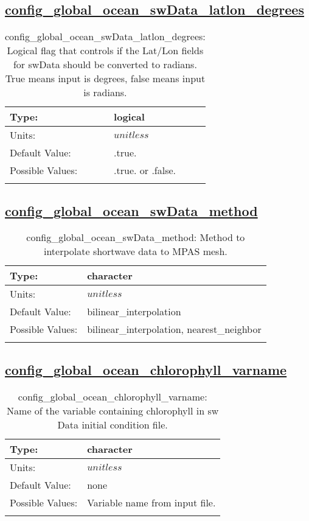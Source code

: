 \subsection[config\_global\_ocean\_swData\_latlon\_degrees]{\hyperref[sec:nm_tab_global_ocean]{config\_global\_ocean\_swData\_latlon\_degrees}}
\label{subsec:nm_sec_config_global_ocean_swData_latlon_degrees}
\begin{center}
\begin{longtable}{| p{2.0in} || p{4.0in} |}
    \hline
    Type: & logical \\
    \hline
    Units: & $unitless$ \\
    \hline
    Default Value: & .true. \\
    \hline
    Possible Values: & .true. or .false. \\
    \hline
    \caption{config\_global\_ocean\_swData\_latlon\_degrees: Logical flag that controls if the Lat/Lon fields for swData should be converted to radians. True means input is degrees, false means input is radians.}
\end{longtable}
\end{center}
\subsection[config\_global\_ocean\_swData\_method]{\hyperref[sec:nm_tab_global_ocean]{config\_global\_ocean\_swData\_method}}
\label{subsec:nm_sec_config_global_ocean_swData_method}
\begin{center}
\begin{longtable}{| p{2.0in} || p{4.0in} |}
    \hline
    Type: & character \\
    \hline
    Units: & $unitless$ \\
    \hline
    Default Value: & bilinear\_interpolation \\
    \hline
    Possible Values: & bilinear\_interpolation, nearest\_neighbor \\
    \hline
    \caption{config\_global\_ocean\_swData\_method: Method to interpolate shortwave data to MPAS mesh.}
\end{longtable}
\end{center}
\subsection[config\_global\_ocean\_chlorophyll\_varname]{\hyperref[sec:nm_tab_global_ocean]{config\_global\_ocean\_chlorophyll\_varname}}
\label{subsec:nm_sec_config_global_ocean_chlorophyll_varname}
\begin{center}
\begin{longtable}{| p{2.0in} || p{4.0in} |}
    \hline
    Type: & character \\
    \hline
    Units: & $unitless$ \\
    \hline
    Default Value: & none \\
    \hline
    Possible Values: & Variable name from input file. \\
    \hline
    \caption{config\_global\_ocean\_chlorophyll\_varname: Name of the variable containing chlorophyll in sw Data initial condition file.}
\end{longtable}
\end{center}
